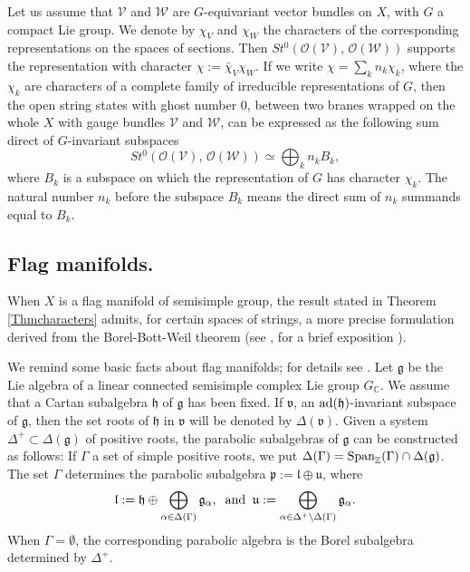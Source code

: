 \documentclass[xypic,amscd,syntonly,amssymb,verbatim,12pt]{amsart}
\theoremstyle{plain}
\theoremstyle{definition}
\theoremstyle{remark}
\numberwithin{equation}{section}
\begin{document}
Let us assume that ${\mathcal V}$ and ${\mathcal W}$ are $G$-equivariant vector bundles on $X$, with $G$ a compact Lie group. We denote by
  $\chi_V$ and $\chi_W$  the characters   of the corresponding representations on the spaces of sections. Then $St^0({\mathcal O}({\mathcal V}),\,{\mathcal O}({\mathcal W}))$ supports the representation with character $\chi:=\bar\chi_{V}\chi_W$. If we write
 $\chi=\sum_k n_k\chi_k$, where the $\chi_k$ are characters of a complete family of irreducible representations of $G$, then
 the open string states with ghost number $0$, between two  branes wrapped on the whole $X$ with gauge
 bundles ${\mathcal V}$ and
 ${\mathcal W}$, can be expressed as the following sum direct  of  $G$-invariant subspaces
 $$St^0({\mathcal O}({\mathcal V}),\,{\mathcal O}({\mathcal W}))\simeq\bigoplus_kn_kB_{k},$$
 where $B_k$ is a subspace on which the representation  of $G$ has character $\chi_k$.
 The natural number $n_k$ before the subspace $B_k$ means the direct sum of $n_k$ summands equal to $B_k$.


\smallskip




 \subsection{ Flag manifolds.}\label{SubsectFlag}
 When $X$ is a flag manifold of semisimple group, the result stated in Theorem
 \ref{Thmcharacters} admits, for
 certain spaces of strings, a more precise formulation derived
 from the Borel-Bott-Weil theorem (see \cite{B-S,W1}, for a brief exposition \cite[pages 13-22]{K-V}).
 

 We remind some basic facts about flag manifolds;
for details see \cite{Borel}. Let ${\mathfrak g}$ be the Lie
algebra of a linear connected semisimple complex Lie group
$G_{\mathbb C}$. We assume that  a Cartan subalgebra ${\mathfrak
h}$ of ${\mathfrak g}$ has been fixed.
 If ${\mathfrak v}$,  an ${\rm ad}({\mathfrak h})$-invariant
subspace of ${\mathfrak g}$, then the set roots of ${\mathfrak h}$
in ${\mathfrak v}$ will be denoted by  $\Delta({\mathfrak v})$.
Given a system ${\Delta}^+\subset\Delta({\mathfrak g})$ of
positive roots, the parabolic subalgebras of ${\mathfrak g}$
 can be constructed as
follows: If $\Gamma$ a set of simple positive roots, we put
$\Delta(\Gamma)={\rm Span}_{\mathbb
Z}(\Gamma)\cap\Delta({\mathfrak g})$. The set $\Gamma$ determines
the parabolic subalgebra ${\mathfrak p}:={\mathfrak
l}\oplus{\mathfrak u}$, where
 \begin{equation}\label{LeviDes}
 {\mathfrak l}:={\mathfrak
h}\oplus\bigoplus_{\alpha\in\Delta({\Gamma})}{\mathfrak
g}_{\alpha},\;\;\hbox{and}\;\;{\mathfrak u}:=
\bigoplus_{\alpha\in\Delta^+\setminus\Delta({\Gamma})}{\mathfrak
g}_{\alpha}.
 \end{equation}
 When ${\Gamma}=\emptyset$, the corresponding parabolic algebra is the  Borel subalgebra determined by ${\Delta}^+$.
\end{document}
